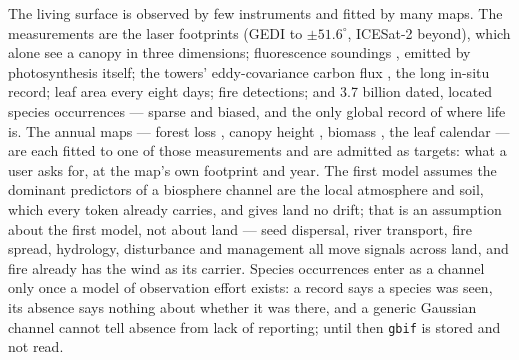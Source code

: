 \documentclass[10pt]{article}
\newcommand{\code}[1]{\texttt{#1}}
\begin{document}
The living surface is observed by few
instruments and fitted by many maps. The measurements are the laser
footprints (GEDI \cite{gedi} to $\pm51.6^\circ$, ICESat-2 \cite{atl08}
beyond), which alone see a canopy in three dimensions; fluorescence
soundings \cite{tropomisif}, emitted by photosynthesis itself; the towers'
eddy-covariance carbon flux \cite{fluxnet}, the long in-situ record; leaf
area every eight days; fire detections; and 3.7 billion dated, located
species occurrences \cite{gbif} --- sparse and biased, and the only global record of
where life is. The annual maps --- forest loss \cite{hansen}, canopy height
\cite{potapov,lang,tolan}, biomass \cite{ccibiomass}, the leaf calendar ---
are each fitted to one of those measurements and are admitted as targets:
what a user asks for, at the map's own footprint and year. The first model
assumes the dominant predictors of a biosphere channel are the local
atmosphere and soil, which every token already carries, and gives land no
drift; that is an assumption about the first model, not about land ---
seed dispersal, river transport, fire spread, hydrology, disturbance and
management all move signals across land, and fire already has the wind as
its carrier. Species occurrences enter as a channel only once a model of
observation effort exists: a record says a species was seen, its absence
says nothing about whether it was there, and a generic Gaussian channel
cannot tell absence from lack of reporting; until then \code{gbif} is
stored and not read.
\end{document}
